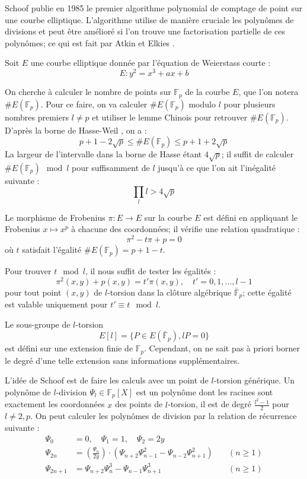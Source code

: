 \documentclass[a4paper]{article}
\theoremstyle{definition}
\theoremstyle{remark}
\numberwithin{equation}{section}
\begin{document}
Schoof \cite{schoof} publie en 1985 le premier algorithme polynomial de comptage de point sur une courbe elliptique. L'algorithme utilise de manière cruciale les polynômes de divisions et peut être amélioré si l'on trouve une factorisation partielle de ces polynômes; ce qui est fait par Atkin \cite{atkin} et Elkies \cite{elkies}.

Soit $E$ une courbe elliptique donnée par l'équation de Weierstass courte :
$$E : y^2 = x^3 + ax + b$$

On cherche à calculer le nombre de points sur $\mathbb{F}_p$ de la courbe $E$, que l'on notera $\#E(\mathbb{F}_p)$. Pour ce faire, on va calculer $\#E(\mathbb{F}_p)$ modulo $l$ pour plusieurs nombres premiers $l \neq p$ et utiliser le lemme Chinois pour retrouver $\#E(\mathbb{F}_p)$. D'après la borne de Hasse-Weil \cite{weil}, on a :
$$p+1 - 2\sqrt{p} \leq \#E(\mathbb{F}_p) \leq p+1 + 2\sqrt{p}$$
La largeur de l'intervalle dans la borne de Hasse étant $4\sqrt{p}$; il suffit de calculer $\#E(\mathbb{F}_p) \mod l$ pour suffisamment de $l$ jusqu'à ce que l'on ait l'inégalité suivante :
\begin{equation}
\label{inegaliteSchoof}
\prod_l l > 4\sqrt{p}
\end{equation}

Le morphisme de Frobenius $\pi : E \longrightarrow E$ sur la courbe $E$ est défini en appliquant le Frobenius $x \mapsto x^p$ à chacune des coordonnées; il vérifie une relation quadratique :
$$\pi^2 - t\pi + p = 0$$
où $t$ satisfait l'égalité $\#E(\mathbb{F}_p) = p + 1 - t$.

Pour trouver $t \mod l$, il nous suffit de tester les égalités :
$$\pi^2(x,y) + p(x,y) = t'\pi(x,y), \quad t' = 0,1,...,l-1$$
pour tout point $(x,y)$ de $l$-torsion dans la clôture algébrique $\bar{\mathbb{F}}_p$; cette égalité est valable uniquement pour $t' \equiv t \mod l$.

Le sous-groupe de $l$-torsion
$$E[l] = \{P \in E(\bar{\mathbb{F}}_p), lP = 0\}$$
est défini sur une extension finie de $\mathbb{F}_p$. Cependant, on ne sait pas à priori borner le degré d'une telle extension sans informations supplémentaires.

L'idée de Schoof \cite{schoof} est de faire les calculs avec un point de $l$-torsion générique. Un polynôme de $l$-division $\Psi_l \in \mathbb{F}_p[X]$ est un polynôme dont les racines sont exactement les coordonnées $x$ des points de $l$-torsion, il est de degré $\frac{l^2-1}{2}$ pour $l \neq 2,p$. On peut calculer les polynômes de division par la relation de récurrence suivante :
\begin{align*}
\Psi_{0} &= 0, \quad \Psi_{1} = 1, \quad \Psi_{2} = 2y \\
\Psi_{2n} &=  \left ( \frac { \Psi_{n}}{2y} \right ) \cdot ( \Psi_{n+2}\Psi^{2}_{n-1} -  \Psi_{n-2} \Psi ^{2}_{n+1})  \quad &(n \geq 1) \\
\Psi_{2n+1} &=  \Psi_{n+2} \Psi_{n}^{ 3}  -  \Psi_{n-1} \Psi ^{3}_{n+1} \quad &(n \geq 1)
\end{align*}
\end{document}
